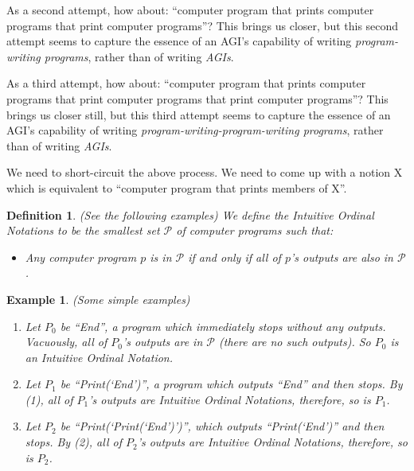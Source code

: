 \documentclass[runningheads]{llncs}
\newtheorem{myexample}[mytheorem]{Example}
\newtheorem{mydefinition}[mytheorem]{Definition}
\begin{document}
As a second attempt, how
about: ``computer program that prints computer programs that print
computer programs''? This brings us closer, but this second attempt
seems to capture the essence of an AGI's capability of writing \emph{program-writing programs},
rather than of writing \emph{AGIs}.

As a third attempt, how about:
``computer program that prints computer programs that print computer programs
that print computer programs''? This brings us closer still, but this third
attempt seems to capture the essence of an AGI's capability of writing
\emph{program-writing-program-writing programs}, rather than of
writing \emph{AGIs}.

We need to short-circuit the above process. We need to come up with a notion
X which is equivalent to ``computer program that prints members of X''.

\begin{mydefinition}
\label{literalnotationdef}
    (See the following examples)
    We define the Intuitive Ordinal Notations to be the smallest set $\mathcal P$
    of computer programs such that:
    \begin{itemize}
        \item
            Any computer program $p$ is in $\mathcal P$ if and only if all of
            $p$'s outputs are also in $\mathcal P$.
    \end{itemize}
\end{mydefinition}

\begin{myexample}
\label{simpleexamples}
(Some simple examples)
    \begin{enumerate}
    \item
    Let $P_0$ be ``End'', a program which immediately stops without any outputs.
    Vacuously, all of $P_0$'s outputs are in $\mathcal P$
    (there are no such outputs). So $P_0$ is an Intuitive Ordinal Notation.
    \item
    Let $P_1$ be ``Print(`End')'', a program which outputs ``End'' and then
    stops. By (1), all of $P_1$'s outputs are Intuitive Ordinal Notations,
    therefore, so is $P_1$.
    \item
    Let $P_2$ be ``Print(`Print(`End')')'', which outputs ``Print(`End')'' and then
    stops. By (2), all of $P_2$'s outputs are Intuitive Ordinal Notations,
    therefore, so is $P_2$.
    \end{enumerate}
\end{myexample}
\end{document}
